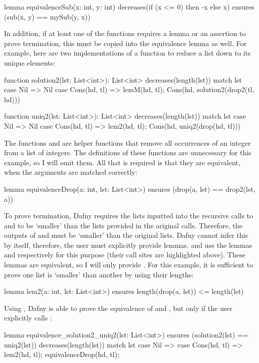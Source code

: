 \begin{dafny}[highlightlines=2]
lemma equivalenceSub(x: int, y: int)
  decreases(if (x <= 0) then -x else x)
  ensures (sub(x, y) == mySub(y, x))
{}
\end{dafny}
%
In addition, if at least one of the functions requires a lemma or an assertion to prove termination, this must be copied into the equivalence lemma as well. For example, here are two implementations of a function to reduce a list down to its unique elements:
\begin{dafny}[highlightlines={6,16}]
function solution2(lst: List<int>): List<int>
  decreases(length(lst)) {
  match lst {
    case Nil        => Nil
    case Cons(hd, tl) =>
      lemM(hd, tl);
      Cons(hd, solution2(drop2(tl, hd)))
  }
}

function uniq2(lst: List<int>): List<int>
  decreases(length(lst)) {
  match lst {
    case Nil => Nil
    case Cons(hd, tl) =>
      lem2(hd, tl);
      Cons(hd, uniq2(drop(hd, tl)))
  }
}
\end{dafny}
%
The functions  and  are helper functions that remove all occurrences of an integer from a list of integers. The definitions of these functions are unnecessary for this example, so I will omit them. All that is required is that they are equivalent, when the arguments are matched correctly:
\begin{dafny}
lemma equivalenceDrop(a: int, lst: List<int>)
  ensures (drop(a, lst) == drop2(lst, a))
{}
\end{dafny}
%
To prove termination, Dafny requires the lists inputted into the recursive calls to  and  to be `smaller' than the lists provided in the original calls. Therefore, the outputs of  and  must be `smaller' than the original lists. Dafny cannot infer this by itself, therefore, the user must explicitly provide lemmas.  and  use the lemmas  and  respectively for this purpose (their call sites are highlighted above). These lemmas are equivalent, so I will only provide . For this example, it is sufficient to prove one list is `smaller' than another by using their lengths:
\begin{dafny}
lemma lem2(a: int, lst: List<int>)
  ensures length(drop(a, lst)) <= length(lst)
{}
\end{dafny}
%
Using , Dafny is able to prove the equivalence of  and , but only if the user explicitly calls :
\begin{dafny}[highlightlines=8]
lemma equivalence_solution2_uniq2(lst: List<int>)
  ensures (solution2(lst) == uniq2(lst))
  decreases(length(lst))
{
  match lst
    case Nil => {}
    case Cons(hd, tl) =>
      lem2(hd, tl);
      equivalenceDrop(hd, tl);
}
\end{dafny}
%

